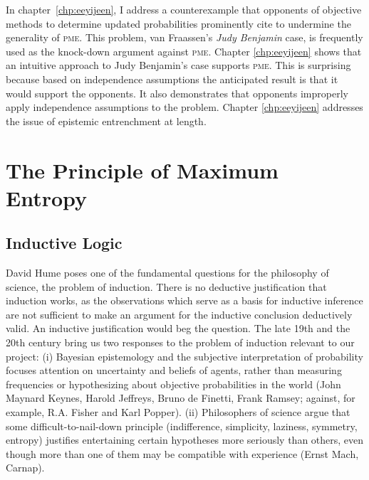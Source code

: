\documentclass[phd,12pt,oneside]{ubcthesis}
\begin{document}
In chapter~\ref{chp:eeyijeen}, I address a counterexample that
opponents of objective methods to determine updated probabilities
prominently cite to undermine the generality of \textsc{pme}. This
problem, van Fraassen's \emph{Judy Benjamin} case, is frequently used
as the knock-down argument against \textsc{pme}. Chapter
\ref{chp:eeyijeen} shows that an intuitive approach to Judy Benjamin's
case supports \textsc{pme}. This is surprising because based on
independence assumptions the anticipated result is that it would
support the opponents. It also demonstrates that opponents improperly
apply independence assumptions to the problem. Chapter
\ref{chp:eeyijeen} addresses the issue of epistemic entrenchment at
length.

\chapter{The Principle of Maximum Entropy}
\label{chp:ohjafaex}

\section{Inductive Logic}
\label{sec:kishooyi}

David Hume poses one of the fundamental questions for the philosophy
of science, the problem of induction. There is no deductive
justification that induction works, as the observations which serve as
a basis for inductive inference are not sufficient to make an argument
for the inductive conclusion deductively valid. An inductive
justification would beg the question. The late 19th and the 20th
century bring us two responses to the problem of induction relevant to
our project: (i) Bayesian epistemology and the subjective
interpretation of probability focuses attention on uncertainty and
beliefs of agents, rather than measuring frequencies or hypothesizing
about objective probabilities in the world (John Maynard Keynes,
Harold Jeffreys, Bruno de Finetti, Frank Ramsey; against, for example,
R.A. Fisher and Karl Popper). (ii) Philosophers of science argue that
some difficult-to-nail-down principle (indifference, simplicity,
laziness, symmetry, entropy) justifies entertaining certain hypotheses
more seriously than others, even though more than one of them may be
compatible with experience (Ernst Mach, Carnap).
\end{document}
